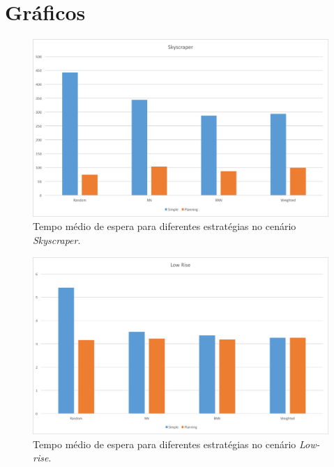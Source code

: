 \section{Gráficos}

\begin{figure}[htb]
  \centering
  \includegraphics[scale=0.5]{img/chart-averages-skyscraper}
  \caption[{Tempo médio de espera no cenário \textit{Skyscraper}.}]{Tempo médio de espera para diferentes estratégias no cenário \textit{Skyscraper}.}
  \label{fig:result:average:skyscraper}
\end{figure}

\begin{figure}[htb]
  \centering
  \includegraphics[scale=0.5]{img/chart-averages-low-rise}
  \caption[Tempo médio de espera no cenário \textit{Low-rise}.]{Tempo médio de espera para diferentes estratégias no cenário \textit{Low-rise}.}
  \label{fig:result:average:low-rise}
\end{figure}

